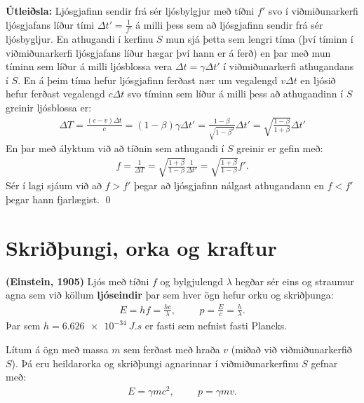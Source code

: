 \textbf{Útleiðsla:} Ljósgjafinn sendir frá sér ljósbylgjur með tíðni $f'$ svo í viðmiðunarkerfi ljósgjafans líður tími $\Delta t' = \frac{1}{f'}$ á milli þess sem að ljósgjafinn sendir frá sér ljósbygljur. En athugandi í kerfinu $S$ mun sjá þetta sem lengri tíma (því tíminn í viðmiðunarkerfi ljósgjafans líður hægar því hann er á ferð) en þar með mun tíminn sem líður á milli ljósblossa vera $\Delta t = \gamma \Delta t'$ í viðmiðunarkerfi athugandans í $S$. En á þeim tíma hefur ljósgjafinn ferðast nær um vegalengd $v \Delta t$ en ljósið hefur ferðast vegalengd $c \Delta t$ svo tíminn sem líður á milli þess að athugandinn í $S$ greinir ljósblossa er:
\begin{align*}
    \Delta T = \frac{(c-v)\Delta t}{c} = \left(1 - \beta \right) \gamma \Delta t' = \frac{1-\beta}{\sqrt{1-\beta^2}}\Delta t' = \sqrt{\frac{1- \beta}{1+\beta}} \Delta t'
\end{align*}
En þar með ályktum við að tíðnin sem athugandi í $S$ greinir er gefin með:
\begin{align*}
    f = \frac{1}{\Delta T} = \sqrt{\frac{1 + \beta}{1-\beta}} \frac{1}{\Delta t'} = \sqrt{\frac{1 + \beta}{1-\beta}} f'.
\end{align*}
Sér í lagi sjáum við að $f > f'$ þegar að ljósgjafinn nálgast athugandann en $f < f'$ þegar hann fjarlægist.
\qed

\section{Skriðþungi, orka og kraftur}

\begin{tcolorbox}
\begin{definition}
\textbf{(Einstein, 1905)} Ljós með tíðni $f$ og bylgjulengd $\lambda$ hegðar sér eins og straumur agna sem við köllum \textbf{ljóseindir} þar sem hver ögn hefur orku og skriðþunga:
\begin{align*}
    E = hf = \frac{hc}{\lambda}, \hspace{1cm} p = \frac{E}{c} = \frac{h}{\lambda}.
\end{align*}
Þar sem $h = \SI{6.626e-34}{J.s}$ er fasti sem nefnist fasti Plancks.
\end{definition}
\end{tcolorbox}

\begin{tcolorbox}
\begin{theorem}
Lítum á ögn með massa $m$ sem ferðast með hraða $v$ (miðað við viðmiðunarkerfið $S$). Þá eru heildarorka og skriðþungi agnarinnar í viðmiðunarkerfinu $S$ gefnar með:
\begin{align*}
   E = \gamma mc^2, \hspace{1cm} p = \gamma mv.
\end{align*}
\end{theorem}
\end{tcolorbox}

